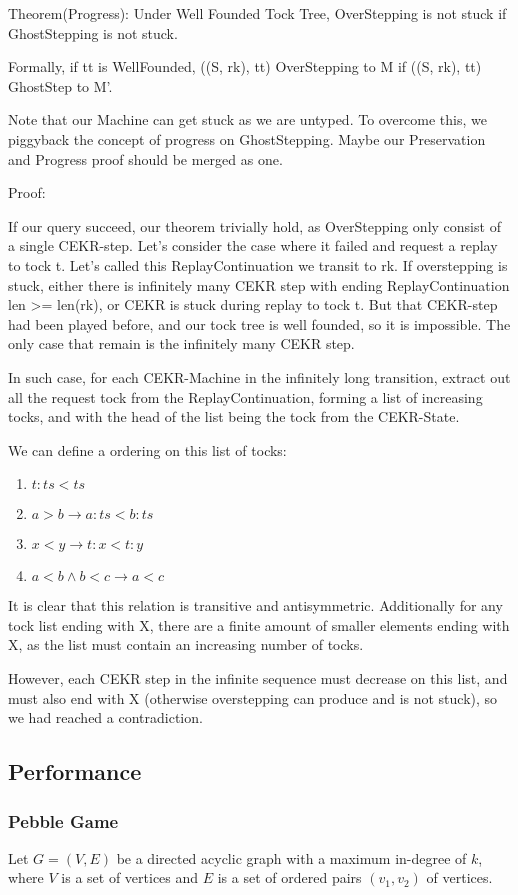 Theorem(Progress): Under Well Founded Tock Tree, OverStepping is not stuck if GhostStepping is not stuck.

Formally, if tt is WellFounded, ((S, rk), tt) OverStepping to M if ((S, rk), tt) GhostStep to M'.

Note that our Machine can get stuck as we are untyped. To overcome this, we piggyback the concept of progress on GhostStepping. Maybe our Preservation and Progress proof should be merged as one.

Proof: 

If our query succeed, our theorem trivially hold, as OverStepping only consist of a single CEKR-step.
Let's consider the case where it failed and request a replay to tock t. Let's called this ReplayContinuation we transit to rk. If overstepping is stuck, either there is infinitely many CEKR step with ending ReplayContinuation len >= len(rk), or CEKR is stuck during replay to tock t. But that CEKR-step had been played before, and our tock tree is well founded, so it is impossible. The only case that remain is the infinitely many CEKR step.

In such case, for each CEKR-Machine in the infinitely long transition, extract out all the request tock from the ReplayContinuation, forming a list of increasing tocks, and with the head of the list being the tock from the CEKR-State.

We can define a ordering on this list of tocks:
\begin{enumerate}
	\item $t:ts < ts$
	\item $a > b \to a:ts < b:ts$
	\item $x < y \to t:x < t:y$
	\item $a < b \land b < c \to a < c$
\end{enumerate}
It is clear that this relation is transitive and antisymmetric. Additionally for any tock list ending with X, there are a finite amount of smaller elements ending with X, as the list must contain an increasing number of tocks.

However, each CEKR step in the infinite sequence must decrease on this list, and must also end with X (otherwise overstepping can produce and is not stuck), so we had reached a contradiction.

\subsection{Performance}
\subsubsection{Pebble Game}
Let $G=(V,E)$ be a directed acyclic graph with a maximum in-degree of $k$, where $V$ is a set of vertices and $E$ is a set of ordered pairs $(v_1, v_2)$ of vertices.

